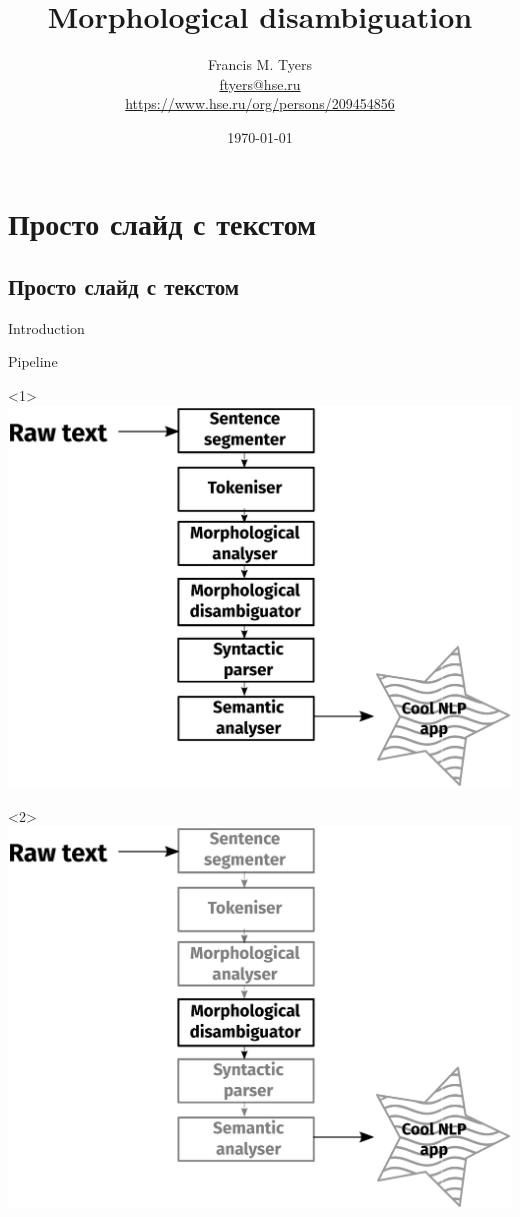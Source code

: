 \documentclass{beamer}
\title[Disambiguation]{Morphological disambiguation}
\author[Francis M. Tyers]{Francis M. Tyers\\ \smallskip \scriptsize \url{ftyers@hse.ru}\\\url{https://www.hse.ru/org/persons/209454856}}
\institute[Высшая школа экономики]{Национальный исследовательский университет \\ «Высшая школа экономики» (Москва)}
\date{\today}
\begin{document}

\frame[plain]{\titlepage}	%

\section{Просто слайд с текстом}
\subsection{Просто слайд с текстом}

\begin{frame}{Introduction}




\end{frame}

\begin{frame}{Pipeline}

\begin{onlyenv}<1>
\includegraphics[width=\textwidth]{images/pipeline.eps}
\end{onlyenv}
\begin{onlyenv}<2>
\includegraphics[width=\textwidth]{images/pipeline-4.eps}
\end{onlyenv}

\end{frame}
\end{document}
